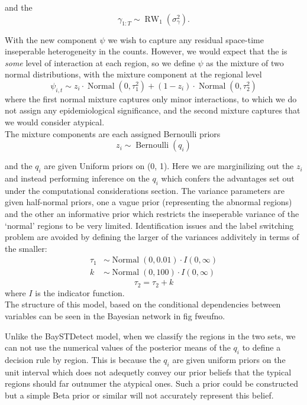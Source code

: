 \documentclass[11pt]{report}
\begin{document}
and the 
\begin{equation*}
\gamma_{1:T} \sim \operatorname{RW}_1(\sigma_\gamma^2).
\end{equation*}

With the new component $\psi$ we wish to capture any residual space-time inseperable heterogeneity in the counts. However, we would expect that the is \emph{some} level of interaction at each region, so we define $\psi$ as the mixture of two normal distributions, with the mixture component at the regional level
\begin{equation}
\psi_{i,t} \sim z_i \cdot \operatorname{Normal}(0, \tau_1^2) + (1 - z_i) \cdot \operatorname{Normal}(0, \tau_2^2)
\end{equation} 
where the first normal mixture captures only minor interactions, to which we do not assign any epidemiological significance, and the second mixture captures that we would consider atypical. \\

The mixture components are each assigned Bernoulli priors 
\begin{equation}
  z_i \sim \operatorname{Bernoulli}(q_i)
\end{equation}

and the $q_i$ are given Uniform priors on (0, 1). Here we are marginilizing out the $z_i$ and instead performing inference on the $q_i$ which confers the advantages set out under the computational considerations section. The variance parameters are given half-normal priors, one a vague prior (representing the abnormal regions) and the other an informative prior which restricts the inseperable variance of the `normal' regions to be very limited. Identification issues and the label switching problem are avoided by defining the larger of the variances addivitely in terms of the smaller:
\begin{align}
  \tau_1 &\sim \operatorname{Normal}(0, 0.01) \cdot I(0, \infty) \\
  k &\sim \operatorname{Normal}(0, 100) \cdot I(0, \infty)
\end{align}
\begin{equation}
 \tau_2 = \tau_2 + k
\end{equation}
where $I$ is the indicator function. \\

The structure of this model, based on the conditional dependencies between variables can be seen in the Bayesian network in fig fweufno. 

Unlike the BaySTDetect model, when we classify the regions in the two sets, we can not use the numerical values of the posterior means of the $q_i$ to define a decision rule by region. This is because the $q_i$ are given uniform priors on the unit interval which does not adequetly convey our prior beliefs that the typical regions should far outnumer the atypical ones. Such a prior could be constructed but a simple Beta prior or similar will not accurately represent this belief. \\
\end{document}
